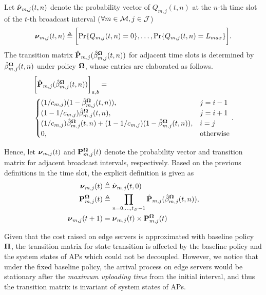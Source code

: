 Let $\hat{\boldsymbol{\nu}}_{m,j}(t,n)$ denote the probability vector of $Q_{m,j}(t,n)$ at the $n$-th time slot of the $t$-th broadcast interval ($\forall m\in\mathcal{M}, j\in\mathcal{J}$)
{\small
\begin{align}
    \vecG{\nu}_{m,j}(t,n) \define \Bracket{
        \Pr\{Q_{m,j}(t,n)=0\}, \dots, \Pr\{Q_{m,j}(t,n)=L_{max}\}
    }.
\end{align}
}
The transition matrix $\hat{\mathbf{P}}_{m,j}(\hat{\beta}^{\boldsymbol{\Omega}}_{m,j}(t,n))$ for adjacent time slots is determined by $\hat{\beta}^{\boldsymbol{\Omega}}_{m,j}(t,n)$ under policy $\boldsymbol{\Omega}$, whose entries are elaborated as follows.
{\small
\begin{align}
    &\bigg[ \hat{\mathbf{P}}_{m,j}(\hat{\beta}^{\boldsymbol{\Omega}}_{m,j}(t,n)) \bigg]_{a,b} =
    \nonumber\\
    &\begin{cases}
        (1/c_{m,j})(1-\hat{\beta}^{\boldsymbol{\Omega}}_{m,j}(t,n)), & j=i-1 \\
        (1-1/c_{m,j})\hat{\beta}^{\boldsymbol{\Omega}}_{m,j}(t,n), & j=i+1 \\
        (1/c_{m,j})\hat{\beta}^{\boldsymbol{\Omega}}_{m,j}(t,n) + (1-1/c_{m,j})(1-\hat{\beta}^{\boldsymbol{\Omega}}_{m,j}(t,n)), & i=j \\
        0, &\text{otherwise}
    \end{cases}.
\end{align}
}

Hence, let $\boldsymbol{\nu}_{m,j}(t)$ and $\mathbf{P}^{\boldsymbol{\Omega}}_{m,j}(t)$ denote the probability vector and transition matrix for adjacent broadcast intervals, respectively.
Based on the previous definitions in the time slot, the explicit definition is given as
\begin{align}
    \boldsymbol{\nu}_{m,j}(t) &\triangleq \hat{\boldsymbol{\nu}}_{m,j}(t,0)
    \\
    \mathbf{P}^{\boldsymbol{\Omega}}_{m,j}(t) &\triangleq \prod_{n=0,\dots,t_B-1} \hat{\mathbf{P}}_{m,j}(\hat{\beta}^{\boldsymbol{\Omega}}_{m,j}(t,n)),
    \\
    \boldsymbol{\nu}_{m,j}(t+1) &= \boldsymbol{\nu}_{m,j}(t) \times \mathbf{P}^{\boldsymbol{\Omega}}_{m,j}(t)
\end{align}

Given that the cost raised on edge servers is approximated with baseline policy $\boldsymbol{\Pi}$, the transition matrix for state transition is affected by the baseline policy and the system states of APs which could not be decoupled.
However, we notice that under the fixed baseline policy, the arrival process on edge servers would be stationary after the \emph{maximum uploading time} from the initial interval, and thus the transition matrix is invariant of system states of APs.

